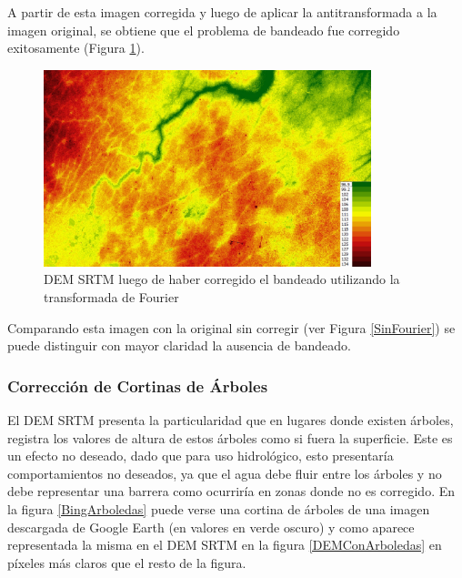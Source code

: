 \documentclass[10pt,a4paper, twoside]{report}
\newcounter{subsubsubsection}[subsubsection]
\begin{document}



A partir de esta imagen corregida y luego de aplicar la antitransformada a la imagen original, se obtiene que el problema de bandeado fue corregido exitosamente (Figura \ref{SRTMSinFourierCorrected}).

\begin{figure}[H]
   \centering      
   \includegraphics[width=0.85\textwidth]{imagenes/SRTMSinFourierCorrected.jpg}
 \caption{DEM SRTM luego de haber corregido el bandeado utilizando la transformada de Fourier}
 \label{SRTMSinFourierCorrected}
\end{figure}

Comparando esta imagen con la original sin corregir (ver Figura \ref{SinFourier}) se puede distinguir con mayor claridad la ausencia de bandeado.


\subsubsection{Corrección de Cortinas de Árboles}
\label{correccionACortinasDeArboles}

El DEM SRTM presenta la particularidad que en lugares donde existen árboles, registra los valores de altura de estos árboles como si fuera la superficie. Este es un efecto no deseado, dado que para uso hidrológico, esto presentaría comportamientos no deseados, ya que el agua debe fluir entre los árboles y no debe representar una barrera como ocurriría en zonas donde no es corregido. En la figura \ref{BingArboledas} puede verse una cortina de árboles de una imagen descargada de Google Earth (en valores en verde oscuro) y como aparece representada la misma en el DEM SRTM en la figura \ref{DEMConArboledas} en píxeles más claros que el resto de la figura.
\end{document}
